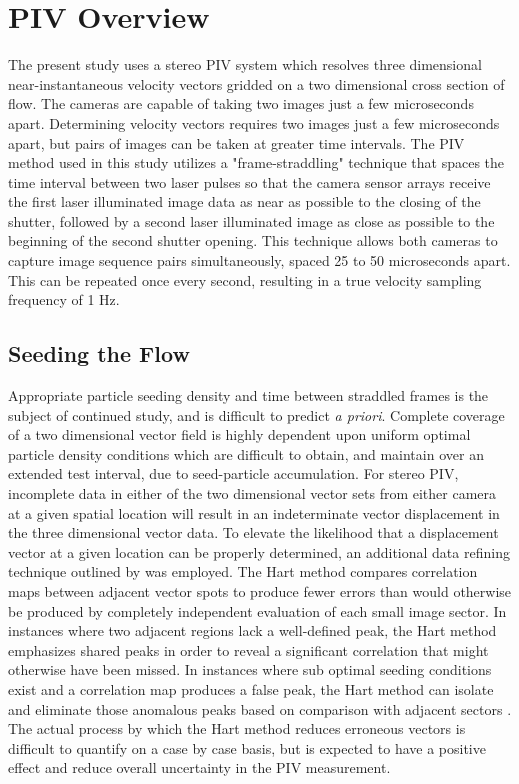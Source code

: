 
\section{PIV Overview}

The present study uses a stereo PIV system which resolves three dimensional 
near-instantaneous velocity vectors gridded on a two dimensional cross section 
of flow. The cameras are capable of taking two images just a few microseconds 
apart. Determining velocity vectors requires two images just a few 
microseconds apart, but pairs of images can be taken at greater time intervals. 
The PIV method used in this study utilizes a "frame-straddling" technique that 
spaces the time interval between two laser pulses so that the camera sensor 
arrays receive the first laser illuminated image data as near as possible to 
the closing of the shutter, followed by a second laser illuminated image as 
close as possible to the beginning of the second shutter opening. This 
technique allows both cameras to capture image sequence pairs simultaneously, 
spaced 25 to 50 microseconds apart. This can be repeated once every second, 
resulting in a true velocity sampling frequency of 1 Hz.

\subsection{Seeding the Flow}

Appropriate particle seeding density and time between straddled frames is the
subject of continued study, and is difficult to predict \textit{a priori}. 
Complete coverage of a two dimensional vector field is highly dependent upon 
uniform optimal particle density conditions which are difficult to obtain, and 
maintain over an extended test interval, due to seed-particle accumulation. For 
stereo PIV, incomplete data in either of the two dimensional vector 
sets from either camera at a given spatial location will result in an 
indeterminate vector displacement in the three dimensional vector data. To 
elevate the likelihood that a displacement vector at a given location can be 
properly determined, an additional data refining technique outlined by 
\cite{hart1998} was employed. The Hart method compares correlation maps 
between adjacent vector spots to produce fewer errors than would otherwise be 
produced by completely independent evaluation of each small image sector. In 
instances where two adjacent regions lack a well-defined peak, the Hart method 
emphasizes shared 
peaks in order to reveal a significant correlation that might otherwise have 
been missed. In instances 
where sub optimal seeding conditions exist and a correlation map 
produces a false peak, the Hart method can isolate and eliminate those 
anomalous peaks based on comparison with adjacent sectors \cite{hart1998}. The 
actual process by which the Hart method reduces erroneous vectors is difficult 
to quantify on a case by case basis, but is expected to have a positive effect 
and reduce overall uncertainty in the PIV measurement.